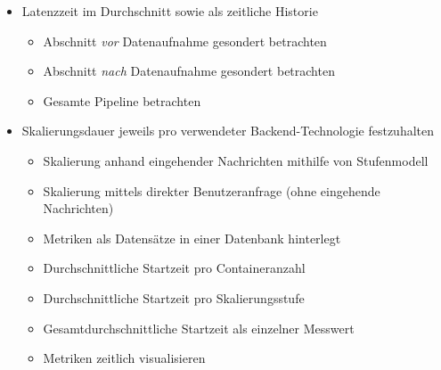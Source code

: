 \begin{itemize}
  \item Latenzzeit im Durchschnitt sowie als zeitliche Historie
  \begin{itemize}
    \item Abschnitt \emph{vor} Datenaufnahme gesondert betrachten
    \item Abschnitt \emph{nach} Datenaufnahme gesondert betrachten
    \item Gesamte Pipeline betrachten
  \end{itemize}
  \item Skalierungsdauer jeweils pro verwendeter Backend-Technologie festzuhalten
  \begin{itemize}
    \item Skalierung anhand eingehender Nachrichten mithilfe von Stufenmodell
    \item Skalierung mittels direkter Benutzeranfrage (ohne eingehende Nachrichten)
    \item Metriken als Datensätze in einer Datenbank hinterlegt
    \item Durchschnittliche Startzeit pro Containeranzahl 
    \item Durchschnittliche Startzeit pro Skalierungsstufe 
    \item Gesamtdurchschnittliche Startzeit als einzelner Messwert
    \item Metriken zeitlich visualisieren
  \end{itemize}
\end{itemize}